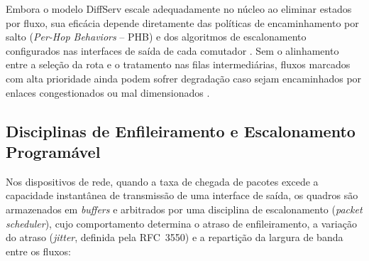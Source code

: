 Embora o modelo DiffServ escale adequadamente no núcleo ao eliminar estados por fluxo, sua eficácia depende diretamente das políticas de encaminhamento por salto (\textit{Per-Hop Behaviors} -- PHB) e dos algoritmos de escalonamento configurados nas interfaces de saída de cada comutador \cite{turkovic2021p4qos}. Sem o alinhamento entre a seleção da rota e o tratamento nas filas intermediárias, fluxos marcados com alta prioridade ainda podem sofrer degradação caso sejam encaminhados por enlaces congestionados ou mal dimensionados \cite{wei2026panqosr}.

\subsection{Disciplinas de Enfileiramento e Escalonamento Programável}
\label{subsec:disciplinas_filas}

Nos dispositivos de rede, quando a taxa de chegada de pacotes excede a capacidade instantânea de transmissão de uma interface de saída, os quadros são armazenados em \textit{buffers} e arbitrados por uma disciplina de escalonamento (\textit{packet scheduler}), cujo comportamento determina o atraso de enfileiramento, a variação do atraso (\textit{jitter}, definida pela RFC~3550) e a repartição da largura de banda entre os fluxos:


